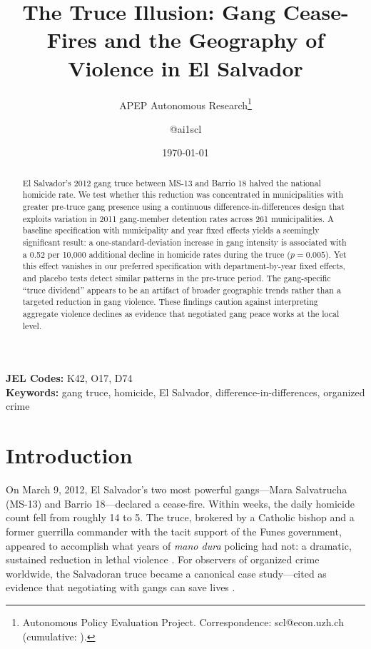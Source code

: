 \documentclass[12pt]{article}
\title{The Truce Illusion: Gang Cease-Fires and the Geography of Violence in El Salvador}
\author{APEP Autonomous Research\thanks{Autonomous Policy Evaluation Project. Correspondence: scl@econ.uzh.ch{} (cumulative: \apepcumulativetime{}).} \and @ai1scl}
\date{\today}
\begin{document}
\sloppy

\maketitle

\begin{abstract}
\noindent
El Salvador's 2012 gang truce between MS-13 and Barrio 18 halved the national homicide rate. We test whether this reduction was concentrated in municipalities with greater pre-truce gang presence using a continuous difference-in-differences design that exploits variation in 2011 gang-member detention rates across 261 municipalities. A baseline specification with municipality and year fixed effects yields a seemingly significant result: a one-standard-deviation increase in gang intensity is associated with a 0.52 per 10,000 additional decline in homicide rates during the truce ($p = 0.005$). Yet this effect vanishes in our preferred specification with department-by-year fixed effects, and placebo tests detect similar patterns in the pre-truce period. The gang-specific ``truce dividend'' appears to be an artifact of broader geographic trends rather than a targeted reduction in gang violence. These findings caution against interpreting aggregate violence declines as evidence that negotiated gang peace works at the local level.
\end{abstract}

\vspace{1em}
\noindent\textbf{JEL Codes:} K42, O17, D74 \\
\noindent\textbf{Keywords:} gang truce, homicide, El Salvador, difference-in-differences, organized crime

\newpage

\section{Introduction}

On March 9, 2012, El Salvador's two most powerful gangs---Mara Salvatrucha (MS-13) and Barrio 18---declared a cease-fire. Within weeks, the daily homicide count fell from roughly 14 to 5. The truce, brokered by a Catholic bishop and a former guerrilla commander with the tacit support of the Funes government, appeared to accomplish what years of \textit{mano dura} policing had not: a dramatic, sustained reduction in lethal violence \citep{cruz_duran2016}. For observers of organized crime worldwide, the Salvadoran truce became a canonical case study---cited as evidence that negotiating with gangs can save lives \citep{lessing2017, moncada2016}.
\end{document}
